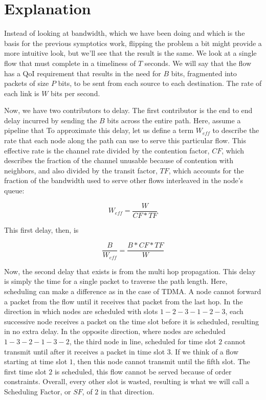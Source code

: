 \documentclass[conference]{IEEEtran}
\begin{document}
\section{Explanation}

Instead of looking at bandwidth, which we have been doing and which is the basis for the previous symptotics work, flipping the problem a bit might provide a more intuitive look, but we'll see that the result is the same.  We look at a single flow that must complete in a timeliness of $T$ seconds.  We will say that the flow has a QoI requirement that results in the need for $B$ bits, fragmented into packets of size $P$ bits, to be sent from each source to each destination.  The rate of each link is $W$ bits per second.

Now, we have two contributors to delay.  The first contributor is the end to end delay incurred by sending the $B$ bits across the entire path.  Here, assume a pipeline that   To approximate this delay, let us define a term $W_{eff}$ to describe the rate that each node along the path can use to serve this particular flow.  This effective rate is the channel rate divided by the contention factor, $CF$, which describes the fraction of the channel unusable because of contention with neighbors, and also divided by the transit factor, $TF$, which accounts for the fraction of the bandwidth used to serve other flows interleaved in the node's queue:

\begin{equation}
	W_{eff} = \frac{W}{CF*TF}
\end{equation}

This first delay, then, is

\begin{equation}
	\frac{B}{W_{eff}} = \frac{B*CF*TF}{W}
\end{equation}

Now, the second delay that exists is from the multi hop propagation.  This delay is simply the time for a single packet to traverse the path length.  Here, scheduling can make a difference as in the case of TDMA.  A node cannot forward a packet from the flow until it receives that packet from the last hop.  In the direction in which nodes are scheduled with slots $1-2-3-1-2-3$, each successive node receives a packet on the time slot before it is scheduled, resulting in no extra delay.  In the opposite direction, where nodes are scheduled $1-3-2-1-3-2$, the third node in line, scheduled for time slot $2$ cannot transmit until after it receives a packet in time slot $3$.  If we think of a flow starting at time slot $1$, then this node cannot transmit until the fifth slot.  The first time slot $2$ is scheduled, this flow cannot be served because of order constraints.  Overall, every other slot is wasted, resulting is what we will call a Scheduling Factor, or $SF$, of $2$ in that direction. 
\end{document}

